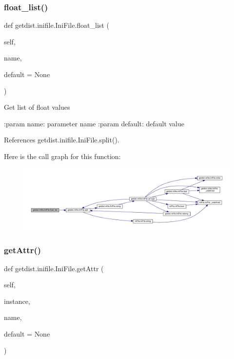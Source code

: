 \subsubsection{\texorpdfstring{float\+\_\+list()}{float\_list()}}
{\footnotesize\ttfamily def getdist.\+inifile.\+Ini\+File.\+float\+\_\+list (\begin{DoxyParamCaption}\item[{}]{self,  }\item[{}]{name,  }\item[{}]{default = {\ttfamily None} }\end{DoxyParamCaption})}

\begin{DoxyVerb}Get list of float values

:param name: parameter name
:param default: default value
\end{DoxyVerb}
 

References getdist.\+inifile.\+Ini\+File.\+split().

Here is the call graph for this function\+:
\nopagebreak
\begin{figure}[H]
\begin{center}
\leavevmode
\includegraphics[width=350pt]{classgetdist_1_1inifile_1_1IniFile_a0fe37e4aafe74c0bea80d1e7912e3d63_cgraph}
\end{center}
\end{figure}
\mbox{\label{classgetdist_1_1inifile_1_1IniFile_aaab553c427125848cdb7c083e8e79a2d}} 
\subsubsection{\texorpdfstring{get\+Attr()}{getAttr()}}
{\footnotesize\ttfamily def getdist.\+inifile.\+Ini\+File.\+get\+Attr (\begin{DoxyParamCaption}\item[{}]{self,  }\item[{}]{instance,  }\item[{}]{name,  }\item[{}]{default = {\ttfamily None} }\end{DoxyParamCaption})}



